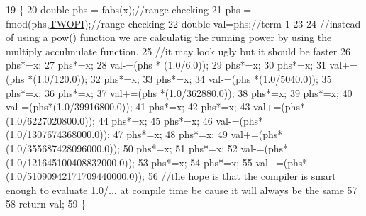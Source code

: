 \begin{DoxyCode}
19                                             \{
20     \textcolor{keywordtype}{double} phs = fabs(x);\textcolor{comment}{//range checking}
21     phs = fmod(phs,\hyperlink{PI_8h_a4912c64aec0c943b7985db6cb61ff83a}{TWOPI});\textcolor{comment}{//range checking}
22     \textcolor{keywordtype}{double} val=phs;\textcolor{comment}{//term 1}
23     
24     \textcolor{comment}{//instead of using a pow() function we are calculatig the running power by using the multiply
       acculmulate function.}
25     \textcolor{comment}{//it may look ugly but it should be faster}
26     phs*=x;
27     phs*=x;
28     val-=(phs * (1.0/6.0));
29     phs*=x;
30     phs*=x;
31     val+=(phs *(1.0/120.0));
32     phs*=x;
33     phs*=x;
34     val-=(phs *(1.0/5040.0));
35     phs*=x;
36     phs*=x;
37     val+=(phs *(1.0/362880.0));
38     phs*=x;
39     phs*=x;
40     val-=(phs*(1.0/39916800.0));
41     phs*=x;
42     phs*=x;
43     val+=(phs*(1.0/6227020800.0));
44     phs*=x;
45     phs*=x;
46     val-=(phs*(1.0/1307674368000.0));
47     phs*=x;
48     phs*=x;
49     val+=(phs*(1.0/355687428096000.0));
50     phs*=x;
51     phs*=x;
52     val-=(phs*(1.0/121645100408832000.0));
53     phs*=x;
54     phs*=x;
55     val+=(phs*(1.0/51090942171709440000.0));
56     \textcolor{comment}{//the hope is that the compiler is smart enough to evaluate 1.0/... at compile time be cause it will
       always be the same}
57     
58     \textcolor{keywordflow}{return} val;
59 \}
\end{DoxyCode}
